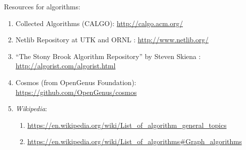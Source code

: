 Resources for algorithms: \vspace{-0.3cm}
\begin{enumerate} \itemsep -4pt
\item Collected Algorithms (CALGO): \url{http://calgo.acm.org/}
\item Netlib Repository at UTK and ORNL \cite{Dongarra2016}: \url{http://www.netlib.org/}
\item ``The Stony Brook Algorithm Repository'' by Steven Skiena \cite{Skiena2008}: \url{http://algorist.com/algorist.html}
\item Cosmos (from OpenGenus Foundation): \url{https://github.com/OpenGenus/cosmos}
\item {\it Wikipedia}: \vspace{-0.3cm}
	\begin{enumerate} \itemsep -2pt
	\item \url{https://en.wikipedia.org/wiki/List_of_algorithm_general_topics}
	\item \url{https://en.wikipedia.org/wiki/List_of_algorithms#Graph_algorithms}
	\end{enumerate}
\end{enumerate}











